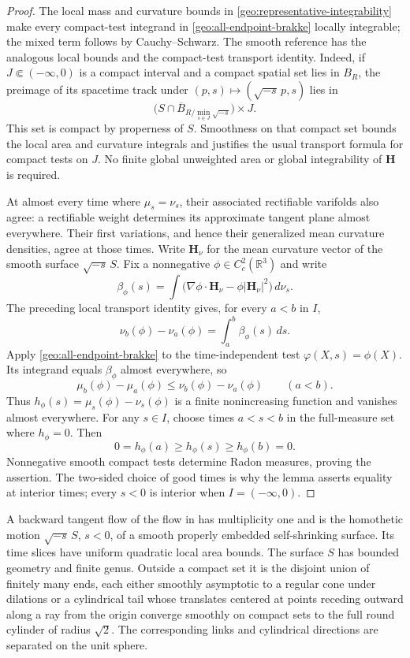 \begin{proof}
The local mass and curvature bounds in
\eqref{geo:representative-integrability} make every compact-test
integrand in \eqref{geo:all-endpoint-brakke} locally integrable;
the mixed term follows by Cauchy--Schwarz.  The smooth reference has
the analogous local bounds and the compact-test transport identity.
Indeed, if $J\Subset(-\infty,0)$ is a compact interval and a compact
spatial set lies in $B_R$, the preimage of its spacetime track under
$(p,s)\mapsto(\sqrt{-s}\,p,s)$ lies in
\[
 \bigl(S\cap\overline B_{R/\min_{s\in J}\sqrt{-s}}\bigr)\times J.
\]
This set is compact by properness of $S$.  Smoothness on that compact
set bounds the local area and curvature integrals and justifies the
usual transport formula for compact tests on $J$.  No finite global
unweighted area or global integrability of $\mathbf H$ is required.

At almost every time where $\mu_s=\nu_s$, their associated rectifiable
varifolds also agree: a rectifiable weight determines its approximate
tangent plane almost everywhere.  Their first variations, and hence
their generalized mean curvature densities, agree at those times.
Write $\mathbf H_\nu$ for the mean curvature vector of the smooth
surface $\sqrt{-s}\,S$.  Fix a nonnegative
$\phi\in C_c^2(\mathbb R^3)$ and write
\[
 \beta_\phi(s)=\int\bigl(\nabla\phi\cdot\mathbf H_\nu
                    -\phi|\mathbf H_\nu|^2\bigr)\,d\nu_s.
\]
The preceding local transport identity gives, for every $a<b$ in $I$,
\[
 \nu_b(\phi)-\nu_a(\phi)=\int_a^b\beta_\phi(s)\,ds.
\]
Apply \eqref{geo:all-endpoint-brakke} to the time-independent test
$\varphi(X,s)=\phi(X)$.  Its integrand equals $\beta_\phi$ almost
everywhere, so
\[
 \mu_b(\phi)-\mu_a(\phi)
 \le\nu_b(\phi)-\nu_a(\phi)\qquad(a<b).
\]
Thus $h_\phi(s)=\mu_s(\phi)-\nu_s(\phi)$ is a finite nonincreasing
function and vanishes almost everywhere.  For any $s\in I$, choose
times $a<s<b$ in the full-measure set where $h_\phi=0$.  Then
\[
 0=h_\phi(a)\ge h_\phi(s)\ge h_\phi(b)=0.
\]
Nonnegative smooth compact tests determine Radon measures, proving
the assertion.  The two-sided choice of good times is why the lemma
asserts equality at interior times; every $s<0$ is interior when
$I=(-\infty,0)$.
\end{proof}


\begin{proposition}\label{geo:tangent}
A backward tangent flow of the flow in  has multiplicity one and is the homothetic motion $\sqrt{-s}\,S$, $s<0$, of a smooth properly embedded self-shrinking surface. Its time slices have uniform quadratic local area bounds. The surface $S$ has bounded geometry and finite genus. Outside a compact set it is the disjoint union of finitely many ends, each either smoothly asymptotic to a regular cone under dilations or a cylindrical tail whose translates centered at points receding outward along a ray from the origin converge smoothly on compact sets to the full round cylinder of radius $\sqrt2$. The corresponding links and cylindrical directions are separated on the unit sphere.
\end{proposition}

